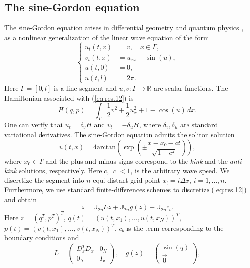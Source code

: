\subsection{The sine-Gordon equation} \label{sec:res.2}
The sine-Gordon equation arises in differential geometry and quantum physics \cite{Misumi2015}, as a nonlinear generalization of the linear wave equation of the form
\begin{equation} \label{eq:res.12}
\left\{
\begin{aligned}
	u_{t}(t,x) &= v, \quad x\in \Gamma,\\
	v_t(t,x) &= u_{xx} - \sin(u), \\
	u(t,0) &= 0, \\
	u(t,l) &= 2\pi.
\end{aligned}
\right.
\end{equation}
Here $\Gamma = [0,l]$ is a line segment and $u,v: \Gamma \to \mathbb R$ are scalar functions. The Hamiltonian associated with (\ref{eq:res.12}) is
\begin{equation} \label{eq:res.13}
	H(q,p) = \int_{\Gamma} \frac 1 2 v^2 + \frac 1 2 u_x^2 + 1 - \cos(u) \ dx.
\end{equation}
One can verify that $u_{t} = \delta_v H$ and $v_{t} = - \delta_u H$, where $\delta_v,\delta_u$ are standard variational derivatives. The sine-Gordon equation admits the soliton solution
\begin{equation} \label{eq:res.14}
	u(t,x) = 4 \text{arctan}\left( \exp \left( \pm \frac{x - x_0 - ct}{\sqrt{1-c^2}} \right) \right),
\end{equation}
where $x_0 \in \Gamma$ and the plus and minus signs correspond to the \emph{kink} and the \emph{anti-kink} solutions, respectively. Here $c$, $|c|<1$, is the arbitrary wave speed. We discretize the segment into $n$ equi-distant grid point $x_i = i\Delta x$, $i=1,\dots,n$. Furthermore, we use standard finite-differences schemes to discretize (\ref{eq:res.12}) and obtain
\begin{equation} \label{eq:res.15}
	\dot z = \mathbb J_{2n} L z + \mathbb J_{2n} g(z) + \mathbb J_{2n} c_b.
\end{equation}
Here $z = (q^T,p^T)^T$, $q(t) = (u(t,x_1),\dots,u(t,x_N))^T$, $p(t) = (v(t,x_1),\dots,v(t,x_N))^T$, $c_b$ is the term corresponding to the boundary conditions and
\begin{equation} \label{eq:res.16}
	L = 
	\begin{pmatrix}
		D_x^TD_x & 0_N \\
		0_N & I_n
	\end{pmatrix}, 
	\quad
	g(z) = 
	\begin{pmatrix}
	\sin(q) \\
	\vec 0
	\end{pmatrix},
\end{equation}
